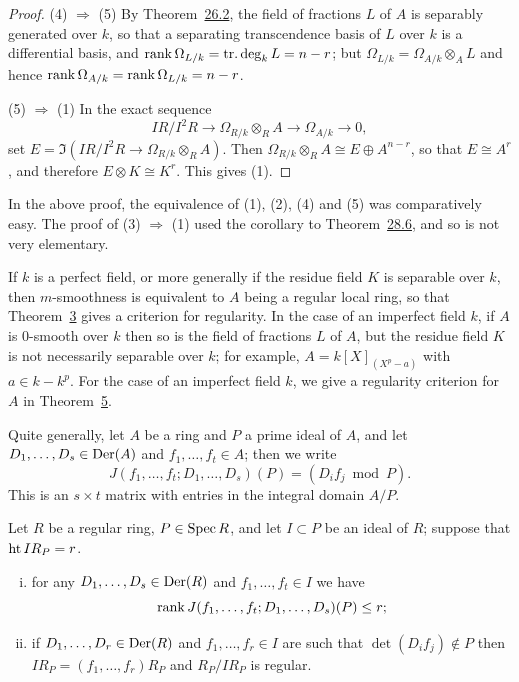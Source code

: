 \begin{proof}
(4) $\Rightarrow$ (5) By Theorem~\hyperref[thm:26.2]{26.2}, the field of fractions $L$ of $A$ is
separably generated over $k$, so that a separating transcendence basis of $L$ over
$k$ is a differential basis, and $\operatorname{rank} \Omega_{L/k} = \operatorname{tr.deg}_k L = n - r$; but
$\Omega_{L/k} = \Omega_{A/k} \otimes_A L$ and hence $\operatorname{rank} \Omega_{A/k} = \operatorname{rank} \Omega_{L/k} = n - r$.

(5) $\Rightarrow$ (1) In the exact sequence
\[
  IR/I^2R \to \Omega_{R/k} \otimes_R A \to \Omega_{A/k} \to 0,
\]
set $E = \Im(IR/I^2R \to \Omega_{R/k} \otimes_R A)$. Then
$\Omega_{R/k} \otimes_R A \cong E \oplus A^{n-r}$, so that $E \cong A^r$, and therefore
$E \otimes K \cong K^r$. This gives (1).
\end{proof}

\begin{remark}
In the above proof, the equivalence of (1), (2), (4) and (5) was comparatively
easy. The proof of (3) $\Rightarrow$ (1) used the corollary to Theorem~\hyperref[thm:28.6]{28.6}, and so
is not very elementary.
\end{remark}

\begin{remark}
If $k$ is a perfect field, or more generally if the residue field $K$ is separable
over $k$, then $m$-smoothness is equivalent to $A$ being a regular local ring, so
that Theorem~\hyperref[thm:30.3]{3} gives a criterion for regularity. In the case of an imperfect
field $k$, if $A$ is 0-smooth over $k$ then so is the field of fractions $L$ of $A$, but
the residue field $K$ is not necessarily separable over $k$; for example,
$A = k[X]_{(X^p - a)}$ with $a \in k - k^p$. For the case of an imperfect field $k$, we
give a regularity criterion for $A$ in Theorem~\hyperref[thm:30.5]{5}.
\end{remark}

Quite generally, let $A$ be a ring and $P$ a prime ideal of $A$, and let
$D_1, \ldots, D_s \in \operatorname{Der}(A)$ and $f_1, \ldots, f_t \in A$; then we write
\[
  J(f_1, \ldots, f_t; D_1, \ldots, D_s)(P) = (D_if_j \bmod P).
\]
This is an $s \times t$ matrix with entries in the integral domain $A/P$.

\begin{theorem}\label{thm:30.4}
Let $R$ be a regular ring, $P \in \operatorname{Spec} R$, and let $I \subset P$ be an ideal of $R$;
suppose that $\operatorname{ht} IR_P = r$.
\begin{enumerate}[(i)]
  \item for any $D_1, \ldots, D_s \in \operatorname{Der}(R)$ and $f_1, \ldots, f_t \in I$ we have
        \[
          \operatorname{rank} J(f_1, \ldots, f_t; D_1, \ldots, D_s)(P) \le r;
        \]
  \item if $D_1, \ldots, D_r \in \operatorname{Der}(R)$ and $f_1, \ldots, f_r \in I$ are such that
        $\det(D_if_j) \notin P$ then $IR_P = (f_1, \ldots, f_r)R_P$ and $R_P/IR_P$ is regular.
\end{enumerate}
\end{theorem}

